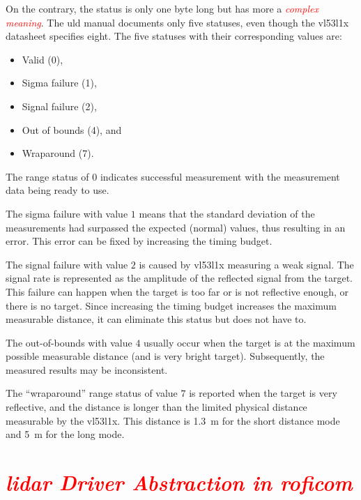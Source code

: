 \documentclass[
  digital,     %
  oneside,     %
  nosansbold,  %
  nocolorbold, %
  nolof,         %
  nolot,         %
]{fithesis4}
\newcommand{\TODO}[1]{\textcolor{red}{\textit{#1}}}
\begin{document}
{{{On the contrary, the status is only one byte long but has more a \TODO{complex meaning}. The \acrshort{uld} manual \cite{um2510} documents only five statuses, even though the \gls{vl53l1x} datasheet \cite{vl53l1x} specifies eight. The five statuses with their corresponding values are:
\begin{itemize}
    \item Valid (0),
    \item Sigma failure (1),
    \item Signal failure (2),
    \item Out of bounds (4), and
    \item Wraparound (7).
\end{itemize}

The range status of $0$ indicates successful measurement with the measurement data being ready to use.

The sigma failure with value $1$ means that the standard deviation of the measurements had surpassed the expected (normal) values, thus resulting in an error. This error can be fixed by increasing the timing budget.

The signal failure with value $2$ is caused by \gls{vl53l1x} measuring a weak signal. The signal rate is represented as the amplitude of the reflected signal from the target. This failure can happen when the target is too far or is not reflective enough, or there is no target. Since increasing the timing budget increases the maximum measurable distance, it can eliminate this status but does not have to.

The out-of-bounds with value $4$ usually occur when the target is at the maximum possible measurable distance (and is very bright target). Subsequently, the measured results may be inconsistent.

The ``wraparound'' range status of value $7$ is reported when the target is very reflective, and the distance is longer than the limited physical distance measurable by the \gls{vl53l1x}. This distance is \qty{1.3}{\metre} for the short distance mode and \qty{5}{\metre} for the long mode.

\section[ LiDAR Diver ]{ \TODO{ \acrshort{lidar} Driver Abstraction in \acrshort{roficom} } } \label{sec:lidar-driver}

}}}
\end{document}
